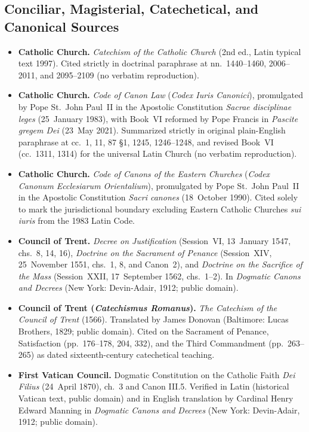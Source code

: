 \subsection*{Conciliar, Magisterial, Catechetical, and Canonical Sources}

\begin{itemize}
\item \textbf{Catholic Church.} \emph{Catechism of the Catholic Church} (2nd ed., Latin typical text 1997). Cited strictly in doctrinal paraphrase at nn.\ 1440--1460, 2006--2011, and 2095--2109 (no verbatim reproduction).
\item \textbf{Catholic Church.} \emph{Code of Canon Law} (\emph{Codex Iuris Canonici}), promulgated by Pope St.\ John Paul~II in the Apostolic Constitution \emph{Sacrae disciplinae leges} (25~January 1983), with Book~VI reformed by Pope Francis in \emph{Pascite gregem Dei} (23~May 2021). Summarized strictly in original plain-English paraphrase at cc.\ 1, 11, 87 \S 1, 1245, 1246--1248, and revised Book~VI (cc.\ 1311, 1314) for the universal Latin Church (no verbatim reproduction).
\item \textbf{Catholic Church.} \emph{Code of Canons of the Eastern Churches} (\emph{Codex Canonum Ecclesiarum Orientalium}), promulgated by Pope St.\ John Paul~II in the Apostolic Constitution \emph{Sacri canones} (18~October 1990). Cited solely to mark the jurisdictional boundary excluding Eastern Catholic Churches \emph{sui iuris} from the 1983 Latin Code.
\item \textbf{Council of Trent.} \emph{Decree on Justification} (Session~VI, 13~January 1547, chs.\ 8, 14, 16), \emph{Doctrine on the Sacrament of Penance} (Session~XIV, 25~November 1551, chs.\ 1, 8, and Canon~2), and \emph{Doctrine on the Sacrifice of the Mass} (Session~XXII, 17~September 1562, chs.\ 1--2). In \emph{Dogmatic Canons and Decrees} (New York: Devin-Adair, 1912; public domain).
\item \textbf{Council of Trent (\emph{Catechismus Romanus}).} \emph{The Catechism of the Council of Trent} (1566). Translated by James Donovan (Baltimore: Lucas Brothers, 1829; public domain). Cited on the Sacrament of Penance, Satisfaction (pp.\ 176--178, 204, 332), and the Third Commandment (pp.\ 263--265) as dated sixteenth-century catechetical teaching.
\item \textbf{First Vatican Council.} Dogmatic Constitution on the Catholic Faith \emph{Dei Filius} (24~April 1870), ch.\ 3 and Canon III.5. Verified in Latin (historical Vatican text, public domain) and in English translation by Cardinal Henry Edward Manning in \emph{Dogmatic Canons and Decrees} (New York: Devin-Adair, 1912; public domain).

\end{itemize}
